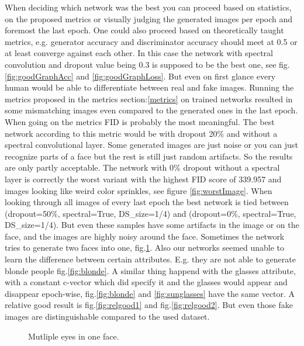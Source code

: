\documentclass[12pt, a4paper]{article}
\begin{document}
When deciding which network was the best you can proceed based on statistics, on the proposed metrics or visually judging the generated images per epoch and foremost the last epoch.
One could also proceed based on theoretically taught metrics, e.g. generator accuracy and discriminator accuracy should meet at 0.5 or at least converge against each other. In this case the network with spectral convolution and dropout 
value being 0.3 is supposed to be the best one, see fig.\ref{fig:goodGraphAcc} and \ref{fig:goodGraphLoss}. But even on first glance every human would be able to differentiate between real and fake images.
Running the metrics proposed in the metrics section:\ref{metrics} on trained networks resulted in some mismatching images even compared to the generated ones in the last epoch. When going on the metrics FID is probably the most meaningful. The best network according to this metric would be with dropout 20\% and without a spectral convolutional layer. Some generated images are just noise or you can just recognize parts of a face but the rest is still just random artifacts. So the results are only partly acceptable. The network with 0\% dropout without a spectral layer is correctly the worst variant with the highest FID score of 339.957 and images looking like weird color sprinkles, see figure \ref{fig:worstImage}.
When looking through all images of every last epoch the best network is tied between (dropout=50\%, spectral=True, DS\_size=1/4) and (dropout=0\%, spectral=True, DS\_size=1/4). But even these samples have some artifacts in the image or on the face, and the images are highly noisy around the face.
Sometimes the network tries to generate two faces into one, fig.\ref{fig:twoFacesInOne}. 
Also our networks seemed unable to learn the difference between certain attributes. 
E.g. they are not able to generate blonde people fig.\ref{fig:blonde}. A similar thing happend with the glasses attribute, with a constant c-vector which did specify it and the glasses would appear and disappear epoch-wise, fig.\ref{fig:blonde} and \ref{fig:sunglasses} have the same vector.
A relative good result is fig.\ref{fig:relgood1} and fig.\ref{fig:relgood2}. But even those fake images are distinguishable compared to the used dataset.
\begin{figure}
    \caption{Mutliple eyes in one face.}
    \label{fig:twoFacesInOne}
\end{figure}
\end{document}
